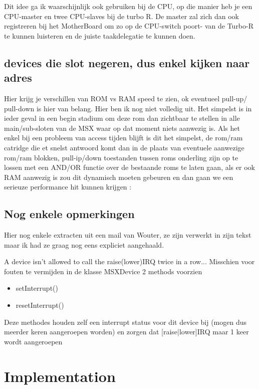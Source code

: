 \documentclass[11pt, a4paper]{report}
\begin{document}
Dit idee ga ik waarschijnlijk ook gebruiken bij de CPU, op die manier heb je een 
CPU-master en twee CPU-slaves bij de turbo R. De master zal zich dan ook registreren 
bij het MotherBoard om zo op de CPU-switch poort- van de Turbo-R te kunnen luisteren 
en de juiste taakdelegatie te kunnen doen.


\section {devices die slot negeren, dus enkel kijken naar adres}

Hier krijg je verschillen van ROM vs RAM speed te  zien, ok eventueel pull-up/ pull-down
is hier van belang. Hier ben ik nog niet volledig uit. Het simpelst is in ieder geval in
een begin stadium om deze rom dan zichtbaar te stellen in alle main/sub-sloten van de MSX
waar op dat moment niets aanwezig is. Als het enkel bij een probleem van access tijden
blijft is dit het simpelst, de rom/ram catridge die et snelst antwoord komt dan in de
plaats van eventuele aanwezige rom/ram blokken, pull-ip/down toestanden tussen roms
onderling zijn op te lossen met een AND/OR functie over de bestaande roms te laten gaan,
als er ook RAM aanwezig is zou dit dynamisch moeten gebeuren en dan gaan we een serieuze
performance hit kunnen krijgen :\


\section{Nog enkele opmerkingen}

Hier nog enkele extracten uit een mail van Wouter, ze zijn verwerkt in zijn tekst maar
ik had ze graag nog eens expliciet aangehaald.

A device isn't allowed to call the raise(lower)IRQ twice in a row...
Misschien voor fouten te vermijden in de klasse MSXDevice 2 methods voorzien
\begin{itemize}
\item setInterrupt()
\item resetInterrupt()
\end{itemize}
Deze methodes houden zelf een interrupt status voor dit device bij (mogen dus 
meerder keren aangeroepen worden) en zorgen dat [raise|lower]IRQ maar 1 keer 
wordt aangeroepen



\chapter{Implementation}
\end{document}
